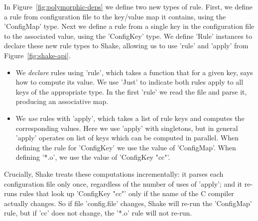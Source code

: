 In Figure~\ref{fig:polymorphic-deps} we define two new types of rule. First, we
define a rule from configuration file to the key/value map it contains, using the
\lst'ConfigMap' type. Next we define a rule from a single key in the configuration file to the associated value,
using the \lst'ConfigKey' type. We define \lst'Rule' instances to declare these
new rule types to Shake, allowing us to use \lst'rule' and \lst'apply' from
Figure~\ref{fig:shake-api}.

\begin{itemize}
\item We \emph{declare} rules using \lst'rule', which takes a function that for a given key,
says how to compute its value. We use \lst'Just' to indicate both rules apply to all
keys of the appropriate type. In the first \lst'rule' we read the file and parse it,
producing an associative map.
\item We \emph{use} rules with \lst'apply', which takes a list of rule keys and computes the
corresponding values. Here we use \lst'apply' with singletons, but in general \lst'apply'
operates on list of keys which can be computed in parallel. When defining the rule
for \lst'ConfigKey' we use the value of \lst'ConfigMap'. When defining \lst'*.o',
we use the value of \lst'ConfigKey "cc"'.
\end{itemize}

Crucially, Shake treats these computations incrementally: it parses each
configuration file only once, regardless of the number of uses of \lst'apply'; and
it re-runs rules that look up \lst'ConfigKey "cc"' only if the
name of the C compiler actually changes.  So if file \lst'config.file' changes,
Shake will re-run the \lst'ConfigMap' rule, but if \lst'cc' does
not change, the \lst'*.o' rule will not re-run.

%

